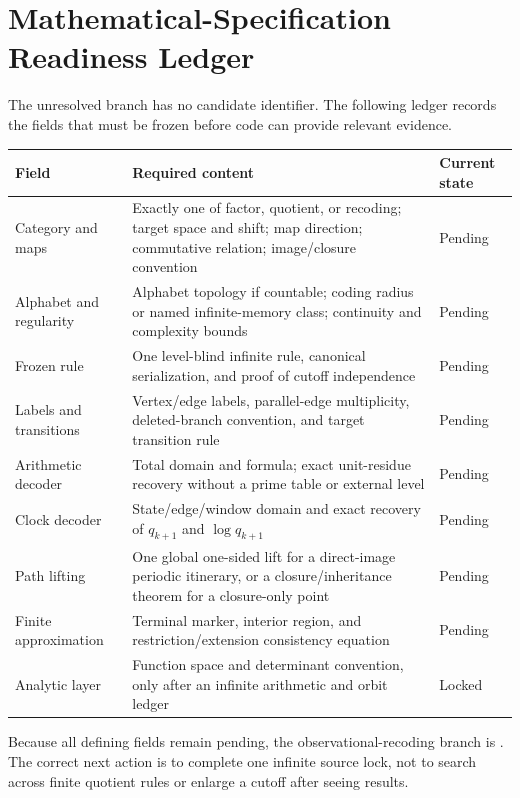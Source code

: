 \section{Mathematical-Specification Readiness Ledger}
\label{app:source-lock}

The unresolved branch has no candidate identifier.  The following ledger
records the fields that must be frozen before code can provide relevant
evidence.

\begin{center}
\small
\begin{tabularx}{\textwidth}{@{}>{\raggedright\arraybackslash}p{}
  >{\raggedright\arraybackslash}X
  >{\raggedright\arraybackslash}p{}@{}}
\toprule
Field & Required content & Current state \\
\midrule
Category and maps & Exactly one of factor, quotient, or recoding; target
space and shift; map direction; commutative relation; image/closure convention &
Pending \\
Alphabet and regularity & Alphabet topology if countable; coding radius or
named infinite-memory class; continuity and complexity bounds & Pending \\
Frozen rule & One level-blind infinite rule, canonical serialization, and
proof of cutoff independence & Pending \\
Labels and transitions & Vertex/edge labels, parallel-edge multiplicity,
deleted-branch convention, and target transition rule & Pending \\
Arithmetic decoder & Total domain and formula; exact unit-residue recovery
without a prime table or external level & Pending \\
Clock decoder & State/edge/window domain and exact recovery of
$q_{k+1}$ and $\log q_{k+1}$ & Pending \\
Path lifting & One global one-sided lift for a direct-image periodic
itinerary, or a closure/inheritance theorem for a closure-only point &
Pending \\
Finite approximation & Terminal marker, interior region, and
restriction/extension consistency equation & Pending \\
Analytic layer & Function space and determinant convention, only after an
infinite arithmetic and orbit ledger & Locked \\
\bottomrule
\end{tabularx}
\end{center}

Because all defining fields remain pending, the observational-recoding branch
is \notestable.  The correct next action is to complete one infinite source
lock, not to search across finite quotient rules or enlarge a cutoff after
seeing results.

